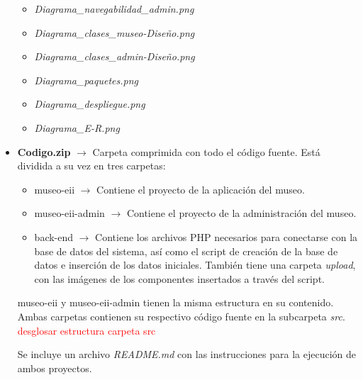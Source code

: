 \begin{itemize}
\begin{itemize}
		\item \textit{Diagrama\_navegabilidad\_admin.png}
		\item \textit{Diagrama\_clases\_museo-Diseño.png}
		\item \textit{Diagrama\_clases\_admin-Diseño.png}
		\item \textit{Diagrama\_paquetes.png}
		\item \textit{Diagrama\_despliegue.png}
		\item \textit{Diagrama\_E-R.png}
	\end{itemize}
	\item \textbf{Codigo.zip} \(\rightarrow\) Carpeta comprimida con todo el código fuente. Está dividida a su vez en tres carpetas:
	\begin{itemize}
		\item museo-eii \(\rightarrow\) Contiene el proyecto de la aplicación del museo.
		\item museo-eii-admin \(\rightarrow\) Contiene el proyecto de la administración del museo.
		\item back-end \(\rightarrow\) Contiene los archivos PHP necesarios para conectarse con la base de datos del sistema, así como el script de creación de la base de datos e inserción de los datos iniciales. También tiene una carpeta \textit{upload}, con las imágenes de los componentes insertados a través del script.
	\end{itemize}
	museo-eii y museo-eii-admin tienen la misma estructura en su contenido. Ambas carpetas contienen su respectivo código fuente en la subcarpeta \textit{src}.
\textcolor{red}{desglosar estructura carpeta src}
\par
	Se incluye un archivo \textit{README.md} con las instrucciones para la ejecución de ambos proyectos.
\end{itemize}

